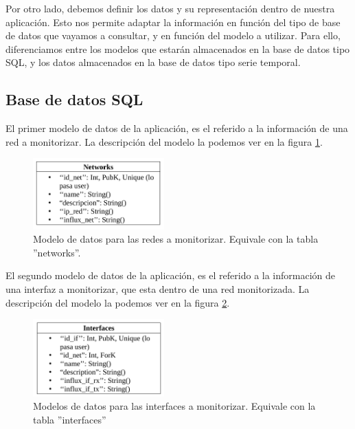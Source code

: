\documentclass[a4paper, oneside, 12pt]{book}
\begin{document}
	\noindent Por otro lado, debemos definir los datos y su representación dentro de nuestra aplicación. Esto nos permite adaptar la información en función del tipo de base de datos que vayamos a consultar, y en función del modelo a utilizar. Para ello, diferenciamos entre los modelos que estarán almacenados en la base de datos tipo SQL, y los datos almacenados en la base de datos tipo serie temporal.
	
	\subsection{Base de datos SQL}
	
	\noindent El primer modelo de datos de la aplicación, es el referido a la información de una red a monitorizar. La descripción del modelo la podemos ver en la figura \ref{img: modelo sql networks}.
	
	\begin{figure}[h!]
		\begin{center}
			\includegraphics[width=0.45\textwidth]{img/model_sql_networks.png}
			\caption{Modelo de datos para las redes a monitorizar. Equivale con la tabla ''networks''.}
			\label{img: modelo sql networks}
		\end{center}
	\end{figure}
	
	\noindent El segundo modelo de datos de la aplicación, es el referido a la información de una interfaz a monitorizar, que esta dentro de una red monitorizada. La descripción del modelo la podemos ver en la figura \ref{img: modelo sql interfaces}.
	
	\begin{figure}[h!]
		\begin{center}
			\includegraphics[width=0.45\textwidth]{img/model_sql_interfaces.png}
			\caption{Modelos de datos para las interfaces a monitorizar. Equivale con la tabla ''interfaces''}
			\label{img: modelo sql interfaces}
		\end{center}
	\end{figure}
	
\end{document}
